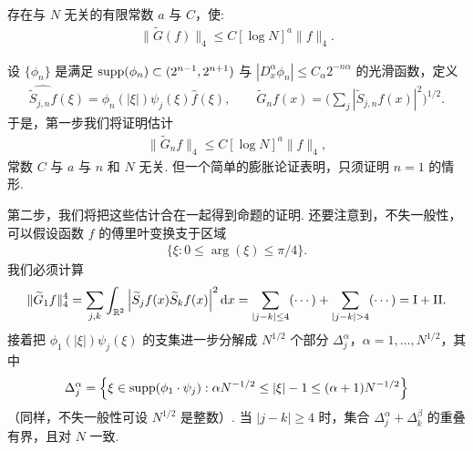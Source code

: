 \begin{proposition}\label{prop:5.13}
存在与 $N$ 无关的有限常数 $a$ 与 $C$，使:
\begin{align*}
  \|\widetilde{G}(f)\|_{4}\leq C\left[\log N\right]^{a}\|f\|_{4}.
\end{align*}
\end{proposition}

设 $\{\phi_n\}$ 是满足 $\operatorname{supp}(\phi_n) \subset (2^{n-1}, 2^{n+1})$ 与 $|D_x^\alpha \phi_n| \leq C_\alpha 2^{-n\alpha}$ 的光滑函数，定义
\begin{align*}
  \widehat{\widetilde{S}_{j,n}f}(\xi)=\phi_{n}(|\xi|)\psi_{j}(\xi)\widehat{f}(\xi),\qquad
  \widetilde{G}_{n}f(x)=\Big(\sum_{j}|\widetilde{S}_{j,n}f(x)|^{2}\Big)^{1/2}.
\end{align*}
于是，第一步我们将证明估计
\begin{align*}
  \|\widetilde{G}_{n}f\|_{4}\leq C\left[\log N\right]^{a}\|f\|_{4},
\end{align*}
常数 $C$ 与 $a$ 与 $n$ 和 $N$ 无关. 但一个简单的膨胀论证表明，只须证明 $n = 1$ 的情形.

第二步，我们将把这些估计合在一起得到命题的证明. 还要注意到，不失一般性，可以假设函数 $f$ 的傅里叶变换支于区域
\begin{align*}
  \{\xi:0\leq\arg(\xi)\leq\pi/4\}.
\end{align*}
我们必须计算
\begin{align*}
  \|\widetilde{G}_{1}f\|_{4}^{4}
  =\sum_{j,k}\int_{\R^{2}}\left|\widetilde{S}_{j}f(x)\widetilde{S}_{k}f(x)\right|^{2}\mathrm{d}x
  =\sum_{|j-k|\leq 4}(\cdots)+\sum_{|j-k|>4}(\cdots)=\mathrm{I}+\mathrm{II}.
\end{align*}
接着把 $\phi_1(|\xi|)\psi_j(\xi)$ 的支集进一步分解成 $N^{1/2}$ 个部分 $\Delta_j^\alpha$，$\alpha = 1, \ldots, N^{1/2}$，其中
\begin{align*}
  \Delta_{j}^{\alpha}=\left\{\xi\in\operatorname{supp}(\phi_{1}\cdot\psi_{j}):\alpha N^{-1/2}\leq|\xi|-1\leq(\alpha+1)N^{-1/2}\right\}
\end{align*}
（同样，不失一般性可设 $N^{1/2}$ 是整数）. 当 $|j - k| \geq 4$ 时，集合 $\Delta_j^\alpha + \Delta_k^\beta$ 的重叠有界，且对 $N$ 一致.

